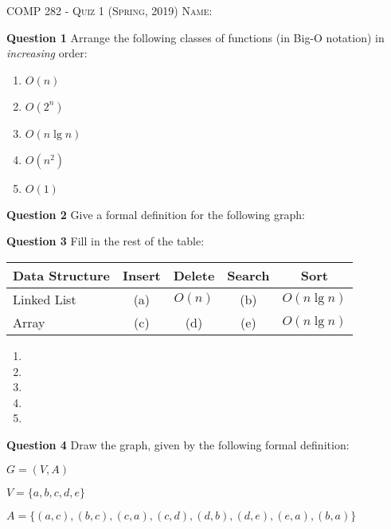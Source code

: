 \documentclass{letter}
\newcommand{\heading}[1]{{\large \textsc{#1}}}
\begin{document}
\heading{COMP 282 - Quiz 1 (Spring, 2019)}
\kern 2cm
\heading{Name:}

{\bf Question 1} \kern 1cm Arrange the following classes of functions (in Big-O
notation) in {\em increasing} order:

\begin{enumerate}[label=(\alph*)]
\item $O(n)$
\item $O(2^n)$
\item $O(n\lg n)$
\item $O(n^2)$
\item $O(1)$
\end{enumerate}

{\bf Question 2} \kern 1cm Give a formal definition for the following graph:


{\bf Question 3} \kern 1cm Fill in the rest of the table:

\begin {tabular}{ l | c | c | c | c }
    Data Structure & Insert & Delete & Search & Sort \\
    \hline
    Linked List & (a) & $O(n)$ & (b) & $O(n\lg n)$ \\
    Array & (c) & (d) & (e) & $O(n\lg n)$ \\
\end{tabular}

\begin{enumerate}[label=(\alph*)]
\item
\item
\item
\item
\item
\end{enumerate}

{\bf Question 4} \kern 1cm Draw the graph, given by the following formal definition:

$G = (V, A)$

$V = \{ a, b, c, d, e \}$ 

$A = \{ (a,c), (b,c), (c,a), (c,d), (d,b), (d,e), (e,a), (b,a) \}$
\end{document}
